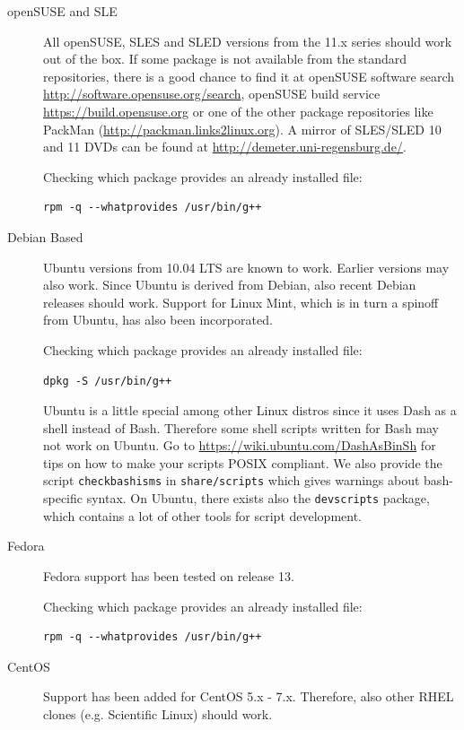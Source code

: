 \begin{description}

\item[openSUSE and  SLE] All openSUSE,  SLES and  SLED versions from  the 11.x
  series should work  out of the box.   If some package is  not available from
  the standard  repositories, there is  a good chance  to find it  at openSUSE
  software  search  \url{http://software.opensuse.org/search}, openSUSE  build
  service  \url{https://build.opensuse.org}  or  one   of  the  other  package
  repositories like  PackMan (\url{http://packman.links2linux.org}).  A mirror
  of     SLES/SLED    10     and     11    DVDs     can     be    found     at
  \url{http://demeter.uni-regensburg.de/}.

\noindent Checking which package provides an already installed file:
\begin{verbatim}
rpm -q --whatprovides /usr/bin/g++
\end{verbatim}

\item[Debian Based] Ubuntu versions from 10.04 LTS are known to work.  Earlier
  versions may  also work. Since  Ubuntu is  derived from Debian,  also recent
  Debian releases  should work.  Support for  Linux Mint, which  is in  turn a
  spinoff from Ubuntu, has also been incorporated.

\noindent Checking which package provides an already installed file:
\begin{verbatim}
dpkg -S /usr/bin/g++
\end{verbatim}

Ubuntu is a little  special among other Linux distros since it  uses Dash as a
shell instead of  Bash. Therefore some shell scripts written  for Bash may not
work on  Ubuntu. Go  to \url{https://wiki.ubuntu.com/DashAsBinSh} for  tips on
how  to  make your  scripts  POSIX  compliant.   We  also provide  the  script
\texttt{checkbashisms}  in  {\tt  share/scripts} which  gives  warnings  about
bash-specific  syntax. On  Ubuntu, there  exists also  the \texttt{devscripts}
package, which contains a lot of other tools for script development.

\item[Fedora] Fedora support has been tested on release 13.

\noindent Checking which package provides an already installed file:
\begin{verbatim}
rpm -q --whatprovides /usr/bin/g++
\end{verbatim}

\item[CentOS] Support  has been added  for CentOS  5.x - 7.x.  Therefore, also
  other RHEL clones (e.g. Scientific Linux) should work.
\end{description}%

